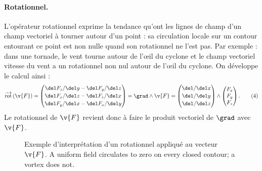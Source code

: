 \paragraph{Rotationnel.}
L'opérateur rotationnel exprime la tendance qu'ont les lignes de champ d'un
champ vectoriel à tourner autour d'un point : sa circulation locale sur un
contour entourant ce point est non nulle quand son rotationnel ne l'est pas.
Par exemple : dans une tornade, le vent tourne autour de l'œil du cyclone et le
champ vectoriel vitesse du vent a un rotationnel non nul autour de l'œil du
cyclone. On développe le calcul ainsi :
\[
  \overrightarrow{\mathrm{rot}}\,(\v{F}) =
  \begin{pmatrix}
    \del F_z/\del y - \del F_y/\del z \\[2pt]
    \del F_x/\del z - \del F_z/\del x \\[2pt]
    \del F_y/\del x - \del F_x/\del y
  \end{pmatrix}
  = \grad \wedge \v{F}
  =
  \begin{pmatrix}
    \del/\del x \\[2pt] \del/\del y \\[2pt] \del/\del z
  \end{pmatrix}
  \wedge
  \begin{pmatrix} F_x \\ F_y \\ F_z \end{pmatrix}.
  \tag*{(4)}
\]
Le rotationnel de $\v{F}$ revient donc à faire le produit vectoriel de
$\grad$ avec $\v{F}$.

\begin{figure}[h!]
  \centering
  \caption*{\small Exemple d'interprétation d'un rotationnel appliqué au
  vecteur $\v{F}$. A uniform field circulates to zero on every closed contour;
  a vortex does not.}
\end{figure}

